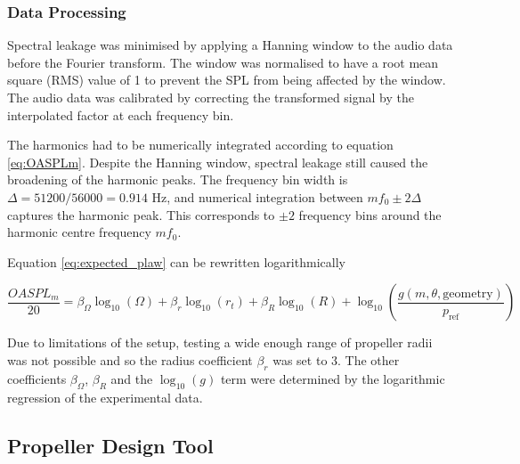 \documentclass[12pt,a4paper]{article}
\begin{document}

\subsubsection{Data Processing}


Spectral leakage was minimised by applying a Hanning window to the audio data before the Fourier transform.
The window was normalised to have a root mean square (RMS) value of 1 to prevent the SPL from being affected by the window.
The audio data was calibrated by correcting the transformed signal by the interpolated factor at each frequency bin.


The harmonics had to be numerically integrated according to equation \ref{eq:OASPLm}.
Despite the Hanning window, spectral leakage still caused the broadening of the harmonic peaks.
The frequency bin width is $ \Delta = 51200 / 56000 = 0.914$ Hz, and numerical integration between $ m f_0 \pm 2 \Delta $ 
captures the harmonic peak.
This corresponds to $\pm2$ frequency bins around the harmonic centre frequency $m f_0$.


Equation \ref{eq:expected_plaw} can be rewritten logarithmically

\begin{equation}
    \frac{OASPL_m}{20} = \beta_\Omega \log_{10}(\Omega) + \beta_r \log_{10}(r_t) +  \beta_R \log_{10}(R) + \log_{10} \left( \frac{g(m, \theta, \text{geometry})}{p_\text{ref}} \right)
\end{equation}

Due to limitations of the setup, testing a wide enough range of propeller radii was not possible and so the radius coefficient $\beta_r$ was set to 3.
The other coefficients $\beta_\Omega$, $\beta_R$ and the $\log_{10}(g)$ term were determined by the logarithmic regression of the experimental data.


\subsection{Propeller Design Tool}
\end{document}
